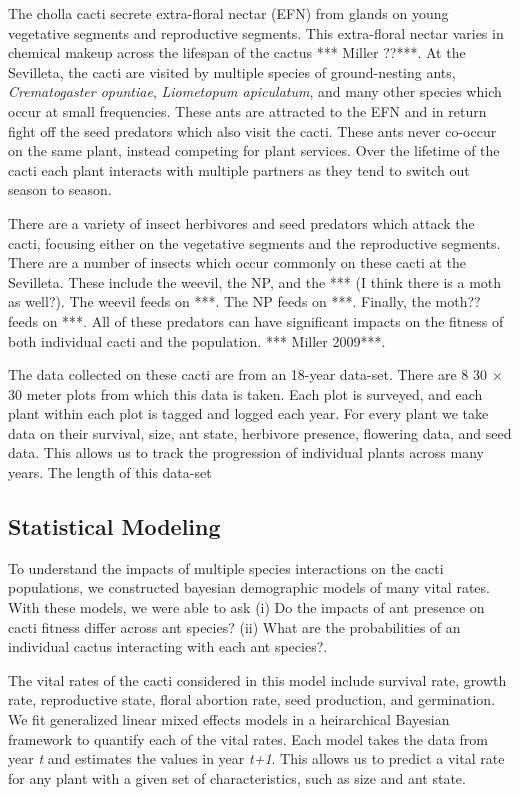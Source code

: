 \documentclass[12pt,a4paper]{article}
\begin{document}
The cholla cacti secrete extra-floral nectar (EFN) from glands on young vegetative segments and reproductive segments. This extra-floral nectar varies in chemical makeup across the lifespan of the cactus *** Miller ??***. 
At the Sevilleta, the cacti are visited by multiple species of ground-nesting ants, \textit{Crematogaster opuntiae}, \textit{Liometopum apiculatum}, and many other species which occur at small frequencies. These ants are attracted to the EFN and in return fight off the seed predators which also visit the cacti. These ants never co-occur on the same plant, instead competing for plant services. Over the lifetime of the cacti each plant interacts with multiple partners as they tend to switch out season to season.

There are a variety of insect herbivores and seed predators which attack the cacti, focusing either on the vegetative segments and the reproductive segments. There are a number of insects which occur commonly on these cacti at the Sevilleta. These include the weevil, the NP, and the *** (I think there is a moth as well?). The weevil feeds on ***. The NP feeds on ***. Finally, the moth?? feeds on ***. All of these predators can have significant impacts on the fitness of both individual cacti and the population. *** Miller 2009***. 

The data collected on these cacti are from an 18-year data-set. There are 8 30 $\times$ 30 meter plots from which this data is taken. Each plot is surveyed, and each plant within each plot is tagged and logged each year. For every plant we take data on their survival, size, ant state, herbivore presence, flowering data, and seed data. This allows us to track the progression of individual plants across many years. The length of this data-set 

\subsection*{Statistical Modeling}
To understand the impacts of multiple species interactions on the cacti populations, we constructed bayesian demographic models of many vital rates. With these models, we were able to ask (i) Do the impacts of ant presence on cacti fitness differ across ant species? (ii) What are the probabilities of an individual cactus interacting with each ant species?. 

The vital rates of the cacti considered in this model include survival rate, growth rate, reproductive state, floral abortion rate, seed production, and germination. We fit generalized linear mixed effects models in a heirarchical Bayesian framework to quantify each of the vital rates. Each model takes the data from year \textit{t} and estimates the values in year \textit{t+1}. This allows us to predict a vital rate for any plant with a given set of characteristics, such as size and ant state. 
\vspace{1cm}
\end{document}
